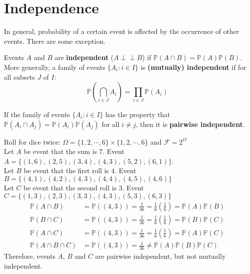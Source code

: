 \documentclass{huhtakm-template-book}
\newcommand{\independent}{\perp\!\!\!\perp}
\newcommand{\prob}{\mathbb{P}}
\begin{document}
\section{Independence}
    In general, probability of a certain event is affected by the occurrence of other events. There are some exception.
    \begin{defn}
        Events $A$ and $B$ are \textbf{independent} ($A\independent B$) if $\prob(A\cap B)=\prob(A)\prob(B)$.\\
        More generally, a family of events $\{A_{i}:i\in I\}$ is \textbf{(mutually) independent} if for all subsets $J$ of $I$:
        \begin{equation*}
            \prob\left(\bigcap_{i\in J}A_{i}\right)=\prod_{i\in J}\prob(A_{i})
        \end{equation*}
    \end{defn}
    \begin{rem}
        If the family of events $\{A_{i}:i\in I\}$ has the property that $\prob(A_{i}\cap A_{j})=\prob(A_{i})\prob(A_{j})$ for all $i\neq j$, then it is \textbf{pairwise independent}.
    \end{rem}
    \begin{eg}
        Roll for dice twice: $\Omega=\{1,2,\cdots,6\}\times\{1,2,\cdots,6\}$ and $\mathcal{F}=2^{\Omega}$\\
        Let $A$ be event that the sum is $7$. Event $A=\{(1,6),(2,5),(3,4),(4,3),(5,2),(6,1)\}$.\\
        Let $B$ be event that the first roll is $4$. Event $B=\{(4,1),(4,2),(4,3),(4,4),(4,5),(4,6)\}$\\
        Let $C$ be event that the second roll is $3$. Event $C=\{(1,3),(2,3),(3,3),(4,3),(5,3),(6,3)\}$
        \begin{align*}
            \prob(A\cap B)&=\prob((4,3))=\frac{1}{36}=\frac{1}{6}\left(\frac{1}{6}\right)=\prob(A)\prob(B)\\
            \prob(B\cap C)&=\prob((4,3))=\frac{1}{36}=\frac{1}{6}\left(\frac{1}{6}\right)=\prob(B)\prob(C)\\
            \prob(A\cap C)&=\prob((4,3))=\frac{1}{36}=\frac{1}{6}\left(\frac{1}{6}\right)=\prob(A)\prob(C)\\
            \prob(A\cap B\cap C)&=\prob((4,3))=\frac{1}{36}\neq\prob(A)\prob(B)\prob(C)
        \end{align*}
        Therefore, events $A$, $B$ and $C$ are pairwise independent, but not mutually independent.
    \end{eg}
\end{document}
